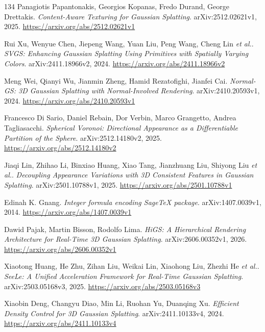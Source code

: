 \documentclass[11pt,a4paper]{article}
\begin{document}
\begin{thebibliography}{134}
Panagiotis Papantonakis, Georgios Kopanas, Fredo Durand, George Drettakis.
\newblock \emph{Content-Aware Texturing for Gaussian Splatting}.
\newblock arXiv:2512.02621v1, 2025.
\newblock \url{https://arxiv.org/abs/2512.02621v1}

Rui Xu, Wenyue Chen, Jiepeng Wang, Yuan Liu, Peng Wang, Cheng Lin \emph{et al.}.
\newblock \emph{SVGS: Enhancing Gaussian Splatting Using Primitives with Spatially Varying Colors}.
\newblock arXiv:2411.18966v2, 2024.
\newblock \url{https://arxiv.org/abs/2411.18966v2}

Meng Wei, Qianyi Wu, Jianmin Zheng, Hamid Rezatofighi, Jianfei Cai.
\newblock \emph{Normal-GS: 3D Gaussian Splatting with Normal-Involved Rendering}.
\newblock arXiv:2410.20593v1, 2024.
\newblock \url{https://arxiv.org/abs/2410.20593v1}

Francesco Di Sario, Daniel Rebain, Dor Verbin, Marco Grangetto, Andrea Tagliasacchi.
\newblock \emph{Spherical Voronoi: Directional Appearance as a Differentiable Partition of the Sphere}.
\newblock arXiv:2512.14180v2, 2025.
\newblock \url{https://arxiv.org/abs/2512.14180v2}

Jiaqi Lin, Zhihao Li, Binxiao Huang, Xiao Tang, Jianzhuang Liu, Shiyong Liu \emph{et al.}.
\newblock \emph{Decoupling Appearance Variations with 3D Consistent Features in Gaussian Splatting}.
\newblock arXiv:2501.10788v1, 2025.
\newblock \url{https://arxiv.org/abs/2501.10788v1}

Edinah K. Gnang.
\newblock \emph{Integer formula encoding SageTeX package}.
\newblock arXiv:1407.0039v1, 2014.
\newblock \url{https://arxiv.org/abs/1407.0039v1}

Dawid Pajak, Martin Bisson, Rodolfo Lima.
\newblock \emph{HiGS: A Hierarchical Rendering Architecture for Real-Time 3D Gaussian Splatting}.
\newblock arXiv:2606.00352v1, 2026.
\newblock \url{https://arxiv.org/abs/2606.00352v1}

Xiaotong Huang, He Zhu, Zihan Liu, Weikai Lin, Xiaohong Liu, Zhezhi He \emph{et al.}.
\newblock \emph{SeeLe: A Unified Acceleration Framework for Real-Time Gaussian Splatting}.
\newblock arXiv:2503.05168v3, 2025.
\newblock \url{https://arxiv.org/abs/2503.05168v3}

Xiaobin Deng, Changyu Diao, Min Li, Ruohan Yu, Duanqing Xu.
\newblock \emph{Efficient Density Control for 3D Gaussian Splatting}.
\newblock arXiv:2411.10133v4, 2024.
\newblock \url{https://arxiv.org/abs/2411.10133v4}


\end{thebibliography}
\end{document}
